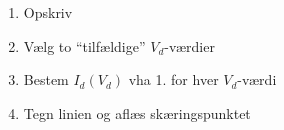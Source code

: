 \begin{enumerate}
    \item Opskriv 
    \item Vælg to ``tilfældige'' $V_d$-værdier
    \item Bestem $I_d(V_d)$ vha 1. for hver $V_d$-værdi
    \item Tegn linien og aflæs skæringspunktet
\end{enumerate}
